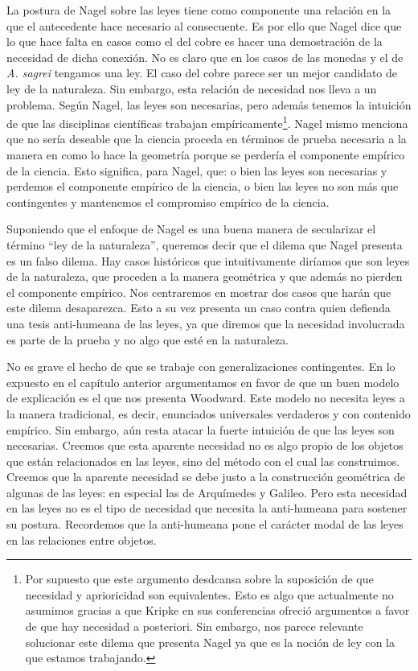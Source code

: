 La postura de Nagel sobre las leyes tiene como componente una relación en la que el antecedente hace necesario al consecuente. Es por ello que Nagel dice que lo que hace falta en casos como el del cobre es hacer una demostración de la necesidad de dicha conexión. No es claro que en los casos de las monedas y el de \emph{A. sagrei} tengamos una ley. El caso del cobre parece ser un mejor candidato de ley de la naturaleza. Sin embargo, esta relación de necesidad nos lleva a un problema. Según Nagel, las leyes son necesarias, pero además tenemos la intuición de que las disciplinas científicas trabajan empíricamente\footnote{Por supuesto que este argumento desdcansa sobre la suposición de que necesidad y aprioricidad son equivalentes. Esto es algo que actualmente no asumimos gracias a que Kripke en sus conferencias ofreció argumentos a favor de que hay necesidad a posteriori. Sin embargo, nos parece relevante solucionar este dilema que presenta Nagel ya que es la noción de ley con la que estamos trabajando.}. Nagel mismo menciona que no sería deseable que la ciencia proceda en términos de prueba necesaria a la manera en como lo hace la geometría \cite[cfr., p. 53]{Nagel2006} porque se perdería el componente empírico de la ciencia. Esto significa, para Nagel, que: o bien las leyes son necesarias y perdemos el componente empírico de la ciencia, o bien las leyes no son más que contingentes y mantenemos el compromiso empírico de la ciencia.

Suponiendo que el enfoque de Nagel es una buena manera de secularizar el término ``ley de la naturaleza'', queremos decir que el dilema que Nagel presenta es un falso dilema. Hay casos históricos que intuitivamente diríamos que son leyes de la naturaleza, que proceden a la manera geométrica y que además no pierden el componente empírico. Nos centraremos en mostrar dos casos que harán que este dilema desaparezca. Esto a su vez presenta un caso contra quien defienda una tesis anti-humeana de las leyes, ya que diremos que la necesidad involucrada es parte de la prueba y no algo que esté en la naturaleza.

No es grave el hecho de que se trabaje con generalizaciones contingentes. En lo expuesto en el capítulo anterior argumentamos en favor de que un buen modelo de explicación es el que nos presenta Woodward. Este modelo no necesita leyes a la manera tradicional, es decir, enunciados universales verdaderos y con contenido empírico. Sin embargo, aún resta atacar la fuerte intuición de que las leyes son necesarias. Creemos que esta aparente necesidad no es algo propio de los objetos que están relacionados en las leyes, sino del método con el cual las construimos. Creemos que la aparente necesidad se debe justo a la construcción geométrica de algunas de las leyes: en especial las de Arquímedes y Galileo. Pero esta necesidad en las leyes no es el tipo de necesidad que necesita la anti-humeana para sostener su postura. Recordemos que la anti-humeana pone el carácter modal de las leyes en las relaciones entre objetos.

